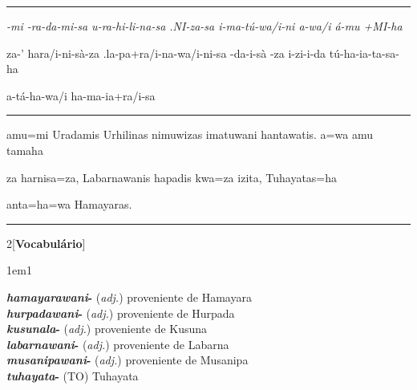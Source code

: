 \vspace{10pt}
\hrule
\vspace{10pt}


\setcounter{parcount}{0}
\begin{parnumbersa}[]
	\raggedright%
	\itshape%
	-mi
	-ra-da-mi-sa
	u-ra-hi-li-na-sa
	.NI-za-sa
	i-ma-tú-wa/i-ni
	a-wa/i
	á-mu
	+MI-ha

	za-'
	hara/i-ni-sà-za
	.la-pa+ra/i-na-wa/i-ni-sa
	-da-i-sà
	-za
	i-zi-i-da
	tú-ha-ia-ta-sa-ha

	a-tá-ha-wa/i ha-ma-ia+ra/i-sa



\end{parnumbersa}

\vspace{10pt}
\hrule
\vspace{10pt}


\setcounter{parcount}{0}
\begin{parnumbersa}[]
	\raggedright%
	\itshape%

	amu=mi Uradamis Urhilinas nimuwizas imatuwani hantawatis. a=wa amu tamaha

	za harnisa=za, Labarnawanis hapadis kwa=za izita,
	Tuhayatas=ha

	anta=ha=wa Hamayaras.


\end{parnumbersa}

\vspace{10pt}
\hrule
\vspace{20pt}



\begin{multicols}{2}[\noindent\textbf{Vocabulário}]
	\begin{hangparas}{1em}{1}
		\raggedright%
		\textbf{\emph{hamayarawani}-} (\emph{adj.}) \tabto{1em} proveniente de Hamayara\\
		\textbf{\emph{hurpadawani}-} (\emph{adj.}) \tabto{1em} proveniente de Hurpada\\
		\textbf{\emph{kusunala}-} (\emph{adj.}) \tabto{1em} proveniente de Kusuna\\
		\textbf{\emph{labarnawani}-} (\emph{adj.}) \tabto{1em} proveniente de Labarna\\
		\textbf{\emph{musanipawani}-} (\emph{adj.}) \tabto{1em} proveniente de Musanipa\\
		\textbf{\emph{tuhayata}-} (TO) \tabto{1em} Tuhayata\\
	\end{hangparas}
\end{multicols}

\vfill
